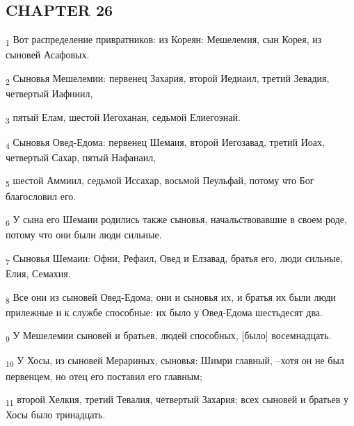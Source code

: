 \subsection{CHAPTER 26}
\begin{tcolorbox}
\textsubscript{1} Вот распределение привратников: из Кореян: Мешелемия, сын Корея, из сыновей Асафовых.
\end{tcolorbox}
\begin{tcolorbox}
\textsubscript{2} Сыновья Мешелемии: первенец Захария, второй Иедиаил, третий Зевадия, четвертый Иафниил,
\end{tcolorbox}
\begin{tcolorbox}
\textsubscript{3} пятый Елам, шестой Иегоханан, седьмой Елиегоэнай.
\end{tcolorbox}
\begin{tcolorbox}
\textsubscript{4} Сыновья Овед-Едома: первенец Шемаия, второй Иегозавад, третий Иоах, четвертый Сахар, пятый Нафанаил,
\end{tcolorbox}
\begin{tcolorbox}
\textsubscript{5} шестой Аммиил, седьмой Иссахар, восьмой Пеульфай, потому что Бог благословил его.
\end{tcolorbox}
\begin{tcolorbox}
\textsubscript{6} У сына его Шемаии родились также сыновья, начальствовавшие в своем роде, потому что они были люди сильные.
\end{tcolorbox}
\begin{tcolorbox}
\textsubscript{7} Сыновья Шемаии: Офни, Рефаил, Овед и Елзавад, братья его, люди сильные, Елия, Семахия.
\end{tcolorbox}
\begin{tcolorbox}
\textsubscript{8} Все они из сыновей Овед-Едома; они и сыновья их, и братья их были люди прилежные и к службе способные: их было у Овед-Едома шестьдесят два.
\end{tcolorbox}
\begin{tcolorbox}
\textsubscript{9} У Мешелемии сыновей и братьев, людей способных, [было] восемнадцать.
\end{tcolorbox}
\begin{tcolorbox}
\textsubscript{10} У Хосы, из сыновей Мерариных, сыновья: Шимри главный, --хотя он не был первенцем, но отец его поставил его главным;
\end{tcolorbox}
\begin{tcolorbox}
\textsubscript{11} второй Хелкия, третий Тевалия, четвертый Захария; всех сыновей и братьев у Хосы было тринадцать.
\end{tcolorbox}
